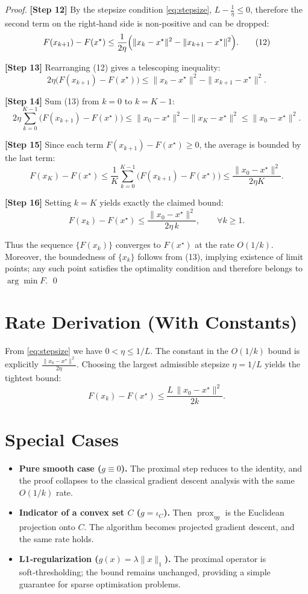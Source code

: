 \documentclass{article}
\newcommand{\prox}{\operatorname{prox}}
\begin{document}
\begin{proof}
\noindent\textbf{[Step 12]}  By the stepsize condition \eqref{eq:stepsize}, $L-\frac{1}{\eta}\le 0$, therefore the second term on the right‑hand side is non‑positive and can be dropped:
\[
F(x_{k+1})-F(x^{\star})\le \frac{1}{2\eta}\Bigl(\|x_{k}-x^{\star}\|^{2}-\|x_{k+1}-x^{\star}\|^{2}\Bigr).
\tag{12}
\]

\noindent\textbf{[Step 13]}  Rearranging (12) gives a telescoping inequality:
\[
2\eta\bigl(F(x_{k+1})-F(x^{\star})\bigr)
\le \|x_{k}-x^{\star}\|^{2}-\|x_{k+1}-x^{\star}\|^{2}.
\tag{13}
\]

\noindent\textbf{[Step 14]}  Sum (13) from $k=0$ to $k=K-1$:
\[
2\eta\sum_{k=0}^{K-1}\bigl(F(x_{k+1})-F(x^{\star})\bigr)
\le \|x_{0}-x^{\star}\|^{2}-\|x_{K}-x^{\star}\|^{2}
\le \|x_{0}-x^{\star}\|^{2}.
\tag{14}
\]

\noindent\textbf{[Step 15]}  Since each term $F(x_{k+1})-F(x^{\star})\ge0$, the average is bounded by the last term:
\[
F(x_{K})-F(x^{\star})\le \frac{1}{K}\sum_{k=0}^{K-1}\bigl(F(x_{k+1})-F(x^{\star})\bigr)
\le \frac{\|x_{0}-x^{\star}\|^{2}}{2\eta K}.
\tag{15}
\]

\noindent\textbf{[Step 16]}  Setting $k=K$ yields exactly the claimed bound:
\[
F(x_{k})-F(x^{\star})\le \frac{\|x_{0}-x^{\star}\|^{2}}{2\eta\,k},\qquad\forall k\ge1.
\tag{16}
\]

Thus the sequence $\{F(x_{k})\}$ converges to $F(x^{\star})$ at the rate $O(1/k)$. Moreover, the boundedness of $\{x_{k}\}$ follows from (13), implying existence of limit points; any such point satisfies the optimality condition and therefore belongs to $\arg\min F$. \qed
\end{proof}

\section*{Rate Derivation (With Constants)}
From \eqref{eq:stepsize} we have $0<\eta\le 1/L$. The constant in the $O(1/k)$ bound is explicitly $\frac{\|x_{0}-x^{\star}\|^{2}}{2\eta}$. Choosing the largest admissible stepsize $\eta=1/L$ yields the tightest bound:
\[
F(x_{k})-F(x^{\star})\le \frac{L\,\|x_{0}-x^{\star}\|^{2}}{2k}.
\]

\section*{Special Cases}
\begin{itemize}
\item \textbf{Pure smooth case ($g\equiv0$).} The proximal step reduces to the identity, and the proof collapses to the classical gradient descent analysis with the same $O(1/k)$ rate.
\item \textbf{Indicator of a convex set $C$ ($g=\iota_{C}$).} Then $\prox_{\eta g}$ is the Euclidean projection onto $C$. The algorithm becomes projected gradient descent, and the same rate holds.
\item \textbf{L1‑regularization ($g(x)=\lambda\|x\|_{1}$).} The proximal operator is soft‑thresholding; the bound remains unchanged, providing a simple guarantee for sparse optimisation problems.
\end{itemize}
\end{document}

